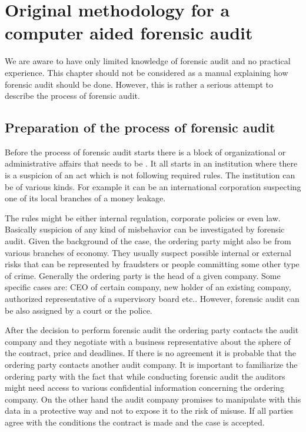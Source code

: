 \chapter{Original methodology for a computer aided forensic audit}
%
%
%


We are aware to have only limited knowledge of forensic audit and no practical experience. This chapter should not be considered as a manual explaining how forensic audit should be done.  However, this is rather a serious attempt to describe the process of forensic audit.


\section{Preparation of the process of forensic audit}
Before the process of forensic audit starts there is a block of organizational or administrative affairs that needs to be . It all starts in an institution where there is a suspicion of an act which is not following required rules. The institution can be of various kinds. For example it can be an international corporation suspecting one of its local branches of a money leakage. %

The rules might be either internal regulation, corporate policies or even law. Basically suspicion of any kind of misbehavior can be investigated by forensic audit. Given the background of the case, the ordering party might also be from various branches of economy. They usually suspect possible internal or external risks that can be represented by fraudsters or people committing some other type of crime.  Generally the ordering party is the head of a given company. Some specific cases are: CEO of certain company, new holder of an existing company, authorized representative of a supervisory board etc.. However, forensic audit can be also assigned by a court or the police. 

After the decision to perform forensic audit the ordering party contacts the audit company and they negotiate with a business representative about the sphere of the contract, price and deadlines. If there is no agreement it is probable that the ordering party contacts another audit company. It is important to familiarize the ordering party with the fact that while conducting forensic audit the auditors might need access to various confidential information concerning the ordering company. On the other hand the audit company promises to manipulate with this data in a protective way and not to expose it to the risk of misuse. If all parties agree with the conditions the contract is made and the case is accepted. 


